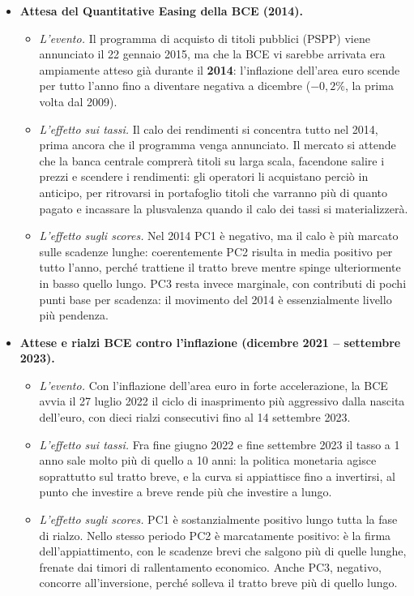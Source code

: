 \documentclass[11pt,a4paper]{article}
\theoremstyle{plain}
\theoremstyle{definition}
\theoremstyle{remark}
\begin{document}
\begin{itemize}
  \item \textbf{Attesa del Quantitative Easing della BCE (2014).}
\begin{itemize}
\item        \emph{L'evento.} Il programma di acquisto di titoli pubblici (PSPP)
        viene annunciato il 22 gennaio 2015, ma che la BCE vi sarebbe arrivata
        era ampiamente atteso già durante il \textbf{2014}: l'inflazione
        dell'area euro scende per tutto l'anno fino a diventare negativa a
        dicembre ($-0{,}2\%$, la prima volta dal 2009).
\item        \emph{L'effetto sui tassi.} Il calo dei rendimenti si concentra
        tutto nel 2014, prima ancora che il programma venga annunciato. Il
        mercato si attende che la banca centrale comprerà titoli su larga
        scala, facendone salire i prezzi e scendere i rendimenti: gli
        operatori li acquistano perciò in anticipo, per ritrovarsi in
        portafoglio titoli che varranno più di quanto pagato e incassare la
        plusvalenza quando il calo dei tassi si materializzerà.
\item        \emph{L'effetto sugli scores.} Nel 2014 PC1 è negativo, ma il calo
        è più marcato sulle scadenze lunghe: coerentemente PC2 risulta in media
        positivo per tutto l'anno, perché trattiene il tratto breve mentre
        spinge ulteriormente in basso quello lungo. PC3 resta invece
        marginale, con contributi di pochi punti base per scadenza: il
        movimento del 2014 è essenzialmente livello più pendenza.
\end{itemize}

  \item \textbf{Attese e rialzi BCE contro l'inflazione (dicembre 2021 --
        settembre 2023).}
\begin{itemize}
\item        \emph{L'evento.} Con l'inflazione dell'area euro in forte accelerazione,
        la BCE avvia il 27 luglio 2022 il ciclo di inasprimento più
        aggressivo dalla nascita dell'euro, con dieci rialzi consecutivi fino
        al 14 settembre 2023.
\item        \emph{L'effetto sui tassi.} Fra fine giugno 2022 e fine settembre
        2023 il tasso a 1 anno sale molto più di quello a 10 anni: la politica
        monetaria agisce soprattutto sul tratto breve, e la curva si
        appiattisce fino a invertirsi, al punto che investire a breve rende
        più che investire a lungo.
\item        \emph{L'effetto sugli scores.} PC1 è sostanzialmente positivo lungo
        tutta la fase di rialzo. Nello stesso periodo PC2 è marcatamente
        positivo: è la firma dell'appiattimento, con le scadenze brevi che
        salgono più di quelle lunghe, frenate dai timori di rallentamento
        economico. Anche PC3, negativo, concorre all'inversione, perché
        solleva il tratto breve più di quello lungo.
\end{itemize}
\end{itemize}
\end{document}
